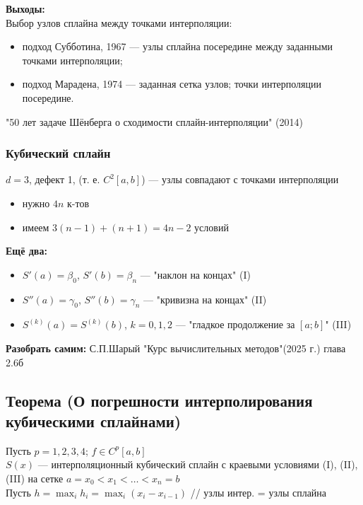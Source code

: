 \textbf{Выходы:} \\
Выбор узлов сплайна между точками интерполяции:
\begin{itemize}
    \item подход Субботина, 1967 --- узлы сплайна посередине между заданными точками интерполяции;
    \item подход Марадена, 1974 --- заданная сетка узлов; точки интерполяции посередине.
\end{itemize}

"50 лет задаче Шёнберга о сходимости сплайн-интерполяции" (2014)

\subsubsection*{Кубический сплайн}

$d = 3$, дефект 1, (т. е. $C^2[a, b]$) --- узлы совпадают с точками интерполяции

\begin{itemize}
    \item нужно $4n$ к-тов
    \item имеем $3(n - 1) + (n + 1) = 4n - 2$ условий
\end{itemize}

\textbf{Ещё два:}

\begin{itemize}
    \item $S'(a) = \beta_0$, $S'(b) = \beta_n$ --- "наклон на концах" (I)
    \item $S''(a) = \gamma_0$, $S''(b) = \gamma_n$ --- "кривизна на концах" (II)
    \item $S^{(k)}(a) = S^{(k)}(b)$, $k = 0, 1, 2$ --- "гладкое продолжение за $[a;b]$" (III)
\end{itemize}

\textbf{Разобрать самим:} С.П.Шарый "Курс вычислительных методов"(2025 г.) глава 2.6б

\subsection*{Теорема (О погрешности интерполирования кубическими сплайнами)}
Пусть $p = 1, 2, 3, 4$; $f \in C^p[a, b]$ \\
$S(x)$ — интерполяционный кубический сплайн с краевыми условиями (I), (II), (III) на сетке $a = x_0 < x_1 < \ldots < x_n = b$ \\
Пусть $h = \max_i h_i = \max_i (x_i - x_{i-1})$ \quad // узлы интер. = узлы сплайна

